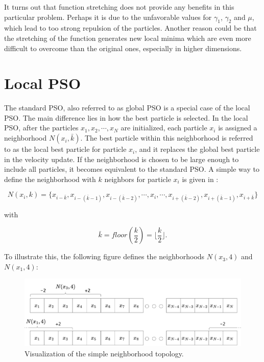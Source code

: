 \documentclass[
  oneside, a4paper, 12pt, openany]{book}
\theoremstyle{definition}
\theoremstyle{definition}
\theoremstyle{definition}
\theoremstyle{definition}
\theoremstyle{remark}
\begin{document}
It turns out that function stretching does not provide any benefits in this particular problem. Perhaps it is due to the unfavorable values for \(\gamma_1\), \(\gamma_2\) and \(\mu\), which lead to too strong repulsion of the particles. Another reason could be that the stretching of the function generates new local minima which are even more difficult to overcome than the original ones, especially in higher dimensions.

\hypertarget{local-pso}{%
\section{Local PSO}\label{local-pso}}

The standard PSO, also referred to as global PSO is a special case of the local PSO. The main difference lies in how the best particle is selected. In the local PSO, after the particles \(x_1, x_2, \cdots, x_N\) are initialized, each particle \(x_i\) is assigned a neighborhood \(N(x_i, \bar{k})\). The best particle within this neighborhood is referred to as the local best particle for particle \(x_i\), and it replaces the global best particle in the velocity update. If the neighborhood is chosen to be large enough to include all particles, it becomes equivalent to the standard PSO. A simple way to define the neighborhood with \(k\) neighbors for particle \(x_i\) is given in \citep{Enge2013}:

\[
  N(x_i, k) = \{ x_{i-\bar{k}}, x_{i-(\bar{k}-1)}, x_{i-(\bar{k}-2)}, \cdots, x_{i}, \cdots, x_{i+(\bar{k}-2)}, x_{i+(\bar{k}-1)}, x_{i+\bar{k}} \}
\]

with

\[
  \bar{k} = floor(\frac{k}{2}) = \lfloor \frac{k}{2} \rfloor.
\]

To illustrate this, the following figure defines the neighborhoods \(N(x_3, 4)\) and \(N(x_1, 4)\):

\begin{figure}
\centering
\includegraphics{img/PSO_local_chart4444.png}
\caption{Visualization of the simple neighborhood topology.}
\end{figure}
\end{document}
